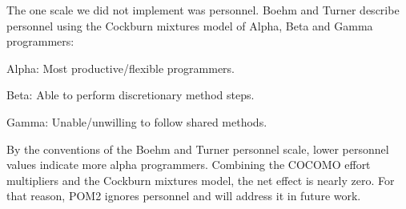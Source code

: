 \begin{kasten}
{    \vspace{3 mm}
    The one scale we did not implement was personnel.  Boehm and Turner describe personnel using the Cockburn mixtures model of Alpha, Beta and Gamma programmers:
    \begin{smallitem}
    \item Alpha: Most productive/flexible programmers.
    \item Beta: Able to perform discretionary method steps.
    \item Gamma: Unable/unwilling to follow shared methods.
    \end{smallitem}
    By the conventions of the Boehm and Turner personnel scale, lower personnel values indicate more alpha programmers.
    Combining the COCOMO effort multipliers and the Cockburn mixtures model, the net effect is nearly zero.  For that reason,
    POM2 ignores personnel and will address it in future work.
    \vspace{1em}
  }
\end{kasten}

